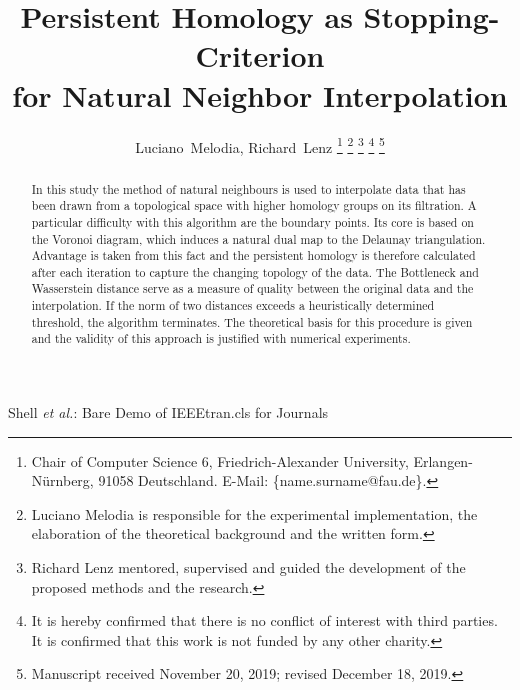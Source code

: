 \documentclass[journal]{IEEEtran}
\begin{document}
%
\title{Persistent Homology as Stopping-Criterion \\ for Natural Neighbor Interpolation}
%
%


\author{Luciano~Melodia,
        Richard~Lenz
\thanks{Chair of Computer Science 6, Friedrich-Alexander University, Erlangen-Nürnberg, 91058 Deutschland. E-Mail: \{name.surname@fau.de\}.}
\thanks{Luciano Melodia is responsible for the experimental implementation, the elaboration of the theoretical background and the written form.}
\thanks{Richard Lenz mentored, supervised and guided the development of the proposed methods and the research.}
\thanks{It is hereby confirmed that there is no conflict of interest with third parties. It is confirmed that this work is not funded by any
other charity.}
\thanks{Manuscript received November 20, 2019; revised December 18, 2019.}}

%
{Shell \MakeLowercase{\textit{et al.}}: Bare Demo of IEEEtran.cls for Journals}
%
\maketitle
\thispagestyle{empty}


\begin{abstract}
\boldmath
In this study the method of natural neighbours is used to interpolate data that has been drawn from a topological space with higher homology groups on its filtration. A particular difficulty with this algorithm are the boundary points. Its core is based on the Voronoi diagram, which induces a natural dual map to the Delaunay triangulation. Advantage is taken from this fact and the persistent homology is therefore calculated after each iteration to capture the changing topology of the data. The Bottleneck and Wasserstein distance serve as a measure of quality between the original data and the interpolation. If the norm of two distances exceeds a heuristically determined threshold, the algorithm terminates. The theoretical basis for this procedure is given and the validity of this approach is justified with numerical experiments.
\end{abstract}
\end{document}
